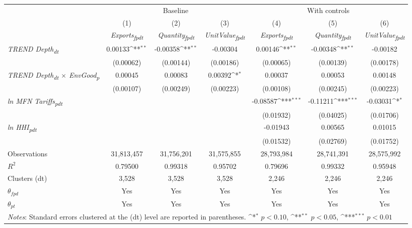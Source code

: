 {
\def\sym#1{\ifmmode^{#1}\else\(^{#1}\)\fi}
\begin{tabular}{l*{6}{c}}
\toprule
&\multicolumn{3}{c}{Baseline}&\multicolumn{3}{c}{With controls}\\\cmidrule(lr){2-4}\cmidrule(lr){5-7}
&(1)&(2)&(3)&(4)&(5)&(6)\\
&\textit{Exports\textsubscript{fpdt}}&\textit{Quantity\textsubscript{fpdt}}&\textit{UnitValue\textsubscript{fpdt}}&\textit{Exports\textsubscript{fpdt}}&\textit{Quantity\textsubscript{fpdt}}&\textit{UnitValue\textsubscript{fpdt}}\\
\midrule
\textit{TREND Depth\textsubscript{dt}} & 0.00133\sym{**} & -0.00358\sym{**} & -0.00304 & 0.00146\sym{**} & -0.00348\sym{**} & -0.00182\\
 & (0.00062) & (0.00144) & (0.00186) & (0.00065) & (0.00139) & (0.00178)\\
\addlinespace
\textit{TREND Depth\textsubscript{dt} $\times$ EnvGood\textsubscript{p}} & 0.00045 & 0.00083 & 0.00392\sym{*} & 0.00037 & 0.00053 & 0.00148\\
 & (0.00107) & (0.00249) & (0.00223) & (0.00108) & (0.00245) & (0.00223)\\
\addlinespace
\textit{ln MFN Tariffs\textsubscript{pdt}} &  &  &  & -0.08587\sym{***} & -0.11211\sym{***} & -0.03031\sym{*}\\
 &  &  &  & (0.01932) & (0.04025) & (0.01706)\\
\addlinespace
\textit{ln HHI\textsubscript{pdt}} &  &  &  & -0.01943 & 0.00565 & 0.01015\\
 &  &  &  & (0.01532) & (0.02769) & (0.01752)\\
\midrule
Observations & 31,813,457 & 31,756,201 & 31,575,855 & 28,793,984 & 28,741,391 & 28,575,992\\
$R^{2}$ & 0.79500 & 0.99318 & 0.95702 & 0.79696 & 0.99332 & 0.95948\\
Clusters (dt) & 3,528 & 3,528 & 3,528 & 2,246 & 2,246 & 2,246\\
$\theta_{fpd}$ & Yes & Yes & Yes & Yes & Yes & Yes\\
$\theta_{pt}$ & Yes & Yes & Yes & Yes & Yes & Yes\\
\bottomrule
\multicolumn{7}{l}{\footnotesize \textit{Notes}: Standard errors clustered at the (dt) level are reported in parentheses. \sym{*} \(p<0.10\), \sym{**} \(p<0.05\), \sym{***} \(p<0.01\)}\\
\end{tabular}
}
